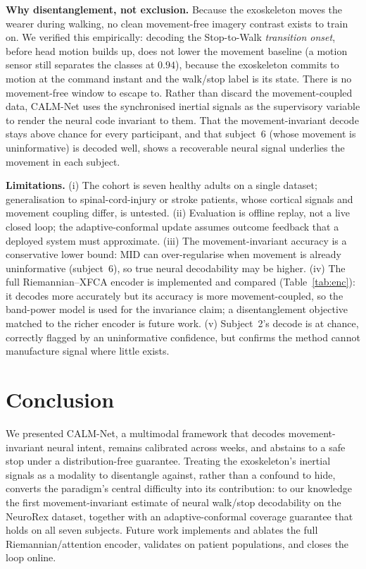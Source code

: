 \documentclass[journal]{IEEEtran}
\begin{document}
\textbf{Why disentanglement, not exclusion.} Because the exoskeleton moves the wearer
during walking, no clean movement-free imagery contrast exists to train on. We
verified this empirically: decoding the Stop-to-Walk \emph{transition onset}, before
head motion builds up, does not lower the movement baseline (a motion sensor still
separates the classes at $0.94$), because the exoskeleton commits to motion at the
command instant and the walk/stop label is its state. There is no movement-free
window to escape to. Rather than discard the movement-coupled data, CALM-Net uses the
synchronised inertial signals as the supervisory variable to render the neural code
invariant to them. That
the movement-invariant decode stays above chance for every participant, and that
subject~6 (whose movement is uninformative) is decoded well, shows a recoverable
neural signal underlies the movement in each subject.

\textbf{Limitations.} (i) The cohort is seven healthy adults on a single dataset;
generalisation to spinal-cord-injury or stroke patients, whose cortical signals and
movement coupling differ, is untested. (ii) Evaluation is offline replay, not a live
closed loop; the adaptive-conformal update assumes outcome feedback that a deployed
system must approximate. (iii) The movement-invariant accuracy is a conservative lower
bound: MID can over-regularise when movement is already uninformative (subject~6), so
true neural decodability may be higher. (iv) The full Riemannian--XFCA encoder is
implemented and compared (Table~\ref{tab:enc}): it decodes more accurately but its
accuracy is more movement-coupled, so the band-power model is used for the invariance
claim; a disentanglement objective matched to the richer encoder is future work.
(v) Subject~2's decode
is at chance, correctly flagged by an uninformative confidence, but confirms the
method cannot manufacture signal where little exists.

\section{Conclusion}
We presented CALM-Net, a multimodal framework that decodes movement-invariant neural
intent, remains calibrated across weeks, and abstains to a safe stop under a
distribution-free guarantee. Treating the exoskeleton's inertial signals as a modality
to disentangle against, rather than a confound to hide, converts the paradigm's central
difficulty into its contribution: to our knowledge the first movement-invariant estimate
of neural walk/stop decodability on the NeuroRex dataset, together with an
adaptive-conformal coverage guarantee that holds on all seven subjects. Future work
implements and ablates the full Riemannian/attention encoder, validates on patient
populations, and closes the loop online.
\end{document}
